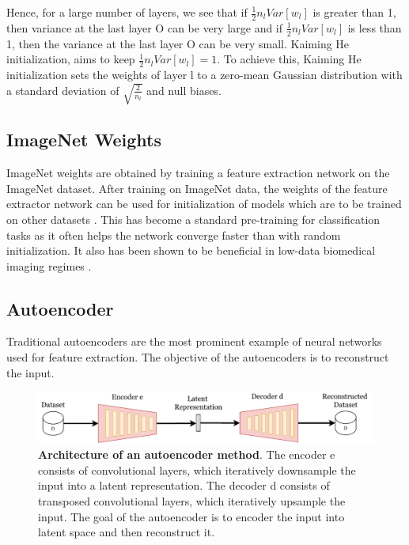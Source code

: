 Hence, for a large number of layers, we see that if $\frac{1}{2}n_l Var[w_l]$ is greater than 1, then variance at the last layer O can be very large and if $\frac{1}{2}n_l Var[w_l]$ is less than 1, then the variance at the last layer O can be very small. Kaiming He initialization, aims to keep $\frac{1}{2}n_l Var[w_l] = 1$. To achieve this, Kaiming He initialization sets the weights of layer l to a zero-mean Gaussian distribution with a standard deviation of $\sqrt{\frac{2}{n_l}}$ and null biases.

\subsection{ImageNet Weights}
ImageNet weights are obtained by training a feature extraction network on the ImageNet dataset. After training on ImageNet data, the weights of the feature extractor network can be used for initialization of models which are to be trained on other datasets \cite{raghu2019}. This has become a standard pre-training for classification tasks as it often helps the network converge faster than with random initialization. It also has been shown to be beneficial in low-data biomedical imaging regimes \cite{raghu2019}. 

\subsection{Autoencoder}
Traditional autoencoders \cite{kramer1991} are the most prominent example of neural networks used for feature extraction. The objective of the autoencoders is to reconstruct the input. 

\begin{figure}[htbp]
\centering
\captionsetup{format=plain}
\includegraphics[keepaspectratio,width=\textwidth]{figures/fig_autoencoder.pdf}
\caption[Architecture of an autoencoder method]{\textbf{Architecture of an autoencoder method}. The encoder e consists of convolutional layers, which iteratively downsample the input into a latent representation. The decoder d consists of transposed convolutional layers, which iteratively upsample the input. The goal of the autoencoder is to encoder the input into latent space and then reconstruct it.}
\label{fig:autoencoder}
\end{figure}

